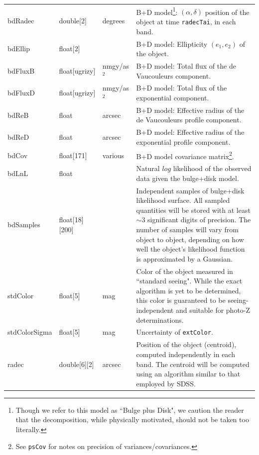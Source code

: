 \documentclass[12pt]{article}
\begin{document}
\begin{center}
\begin{longtable}{p{3cm}p{2cm}p{2cm}p{5cm}}
bdRadec & double[2] & degrees & B+D model\footnote{Though we refer to this model as ``Bulge plus Disk", we caution the reader that the decomposition, while physically motivated, should not be taken too literally.}: $(\alpha, \delta)$ position of the object at time {\tt radecTai}, in each band. \\

bdEllip & float[2] & ~ & B+D model: Ellipticity $(e_1, e_2)$ of the object. \\

bdFluxB & float[ugrizy] & nmgy/as$^2$ & B+D model: Total flux of the de Vaucouleurs component. \\

bdFluxD & float[ugrizy] & nmgy/as$^2$ & B+D model: Total flux of the exponential component. \\

bdReB & float & arcsec & B+D model: Effective radius of the de Vaucouleurs profile component. \\

bdReD & float & arcsec & B+D model: Effective radius of the exponential profile component. \\

bdCov & float[171] & various & B+D model covariance matrix\footnote{See {\tt psCov} for notes on precision of variances/covariances.}. \\ 

bdLnL & float & ~ & Natural $log$ likelihood of the observed data given the bulge+disk model. \\ 

bdSamples & float[18][200] & ~ & Independent samples of bulge+disk likelihood surface. All sampled quantities will be stored with at least $\sim 3$ significant digits of precision. The number of samples will vary from object to object, depending on how well the object's likelihood function is approximated by a Gaussian.\\

stdColor & float[5] & mag & Color of the object measured in ``standard seeing". While the exact algorithm is yet to be determined, this color is guaranteed to be seeing-independent and suitable for photo-Z determinations.\\

stdColorSigma & float[5] & mag & Uncertainty of {\tt extColor}. \\

radec & double[6][2] & arcsec & Position of the object (centroid), computed independently in each band. The centroid will be computed using an algorithm similar to that employed by SDSS.\\


\end{longtable}
\end{center}
\end{document}
